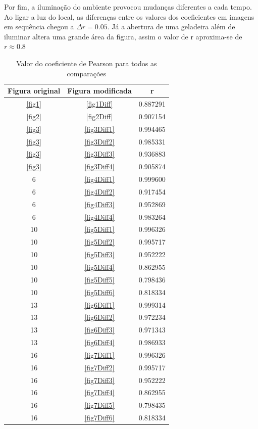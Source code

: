 \documentclass[10pt,a4paper]{article}
\begin{document}
Por fim, a iluminação do ambiente provocou mudanças diferentes a cada
tempo. Ao ligar a luz do local, as diferenças entre os valores dos
coeficientes em imagens em sequência chegou a $\Delta r=0.05 $. Já a
abertura de uma geladeira além de iluminar altera uma grande área da
figura, assim o valor de r aproxima-se de $r\approx 0.8$

\begin{table}[h!]
  \begin{center}
    \caption{Valor do coeficiente de Pearson para todos as comparações}
    \begin{tabular}{|c|c|c|}
      \hline
      Figura original & Figura modificada & r\\
      \hline
      \ref{fig1} &  \ref{fig1Diff} &  0.887291 \\
      \ref{fig2} &  \ref{fig2Diff} &  0.907154\\
      \ref{fig3} &  \ref{fig3Diff1} & 0.994465\\
      \ref{fig3} & \ref{fig3Diff2} &  0.985331\\
      \ref{fig3} &  \ref{fig3Diff3} &  0.936883\\
      \ref{fig3} &  \ref{fig3Diff4} &  0.905874\\
      6 &  \ref{fig4Diff1} & 0.999600\\
      6 &  \ref{fig4Diff2} &  0.917454\\
      6 &  \ref{fig4Diff3} &   0.952869\\
      6 &  \ref{fig4Diff4} &   0.983264\\
      10 &  \ref{fig5Diff1} & 0.996326\\
      10 &  \ref{fig5Diff2} & 0.995717\\
      10 &  \ref{fig5Diff3} & 0.952222\\
      10 &  \ref{fig5Diff4} & 0.862955\\
      10 &  \ref{fig5Diff5} & 0.798436\\
      10 &  \ref{fig5Diff6} & 0.818334\\
      13 &  \ref{fig6Diff1} & 0.999314\\
      13 &  \ref{fig6Diff2} & 0.972234\\
      13 &  \ref{fig6Diff3} & 0.971343\\
      13 &  \ref{fig6Diff4} & 0.986933\\
      16 &  \ref{fig7Diff1} & 0.996326\\
      16 &  \ref{fig7Diff2} & 0.995717\\
      16 &  \ref{fig7Diff3} & 0.952222\\
      16 &  \ref{fig7Diff4} & 0.862955\\
      16 &  \ref{fig7Diff5} & 0.798435\\
      16 &  \ref{fig7Diff6} &  0.818334\\
      \hline
    \end{tabular}
  \end{center}\label{tab:final}
\end{table}
\end{document}
